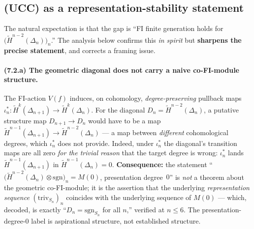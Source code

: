 \documentclass[11pt,reqno]{amsart}
\theoremstyle{plain}
\theoremstyle{definition}
\newcommand{\Hred}{\widetilde H}
\newcommand{\sgn}{\mathrm{sgn}}
\newcommand{\triv}{\mathrm{triv}}
\begin{document}
\subsection{(UCC) as a representation-stability statement}\label{ssec:7.2}
\label{ssec:7.2}
The natural expectation is that the gap is ``FI finite generation holds
for $\bigl(\Hred^{n-2}(\Delta_n)\bigr)_n$.'' The analysis below confirms
this \emph{in spirit} but \textbf{sharpens the precise statement}, and
corrects a framing issue.

\paragraph{(7.2.a) The geometric diagonal does not carry a naive
co-FI-module structure.}
The FI-action $V(f)$ induces, on cohomology, \emph{degree-preserving}
pullback maps
$\iota_n^*:\Hred^k(\Delta_{n+1})\to\Hred^k(\Delta_n)$. For the diagonal
$D_n=\Hred^{n-2}(\Delta_n)$, a putative structure map
$D_{n+1}\to D_n$ would have to be a map
$\Hred^{n-1}(\Delta_{n+1})\to\Hred^{n-2}(\Delta_n)$ --- a map between
\emph{different} cohomological degrees, which $\iota_n^*$ does not
provide. Indeed, under $\iota_n^*$ the diagonal's transition maps are
all zero \emph{for the trivial reason} that the target degree is wrong:
$\iota_n^*$ lands $\Hred^{n-1}(\Delta_{n+1})$ in
$\Hred^{n-1}(\Delta_n)=0$. \textbf{Consequence:} the statement
``$\bigl(\Hred^{n-2}(\Delta_n)\otimes\sgn\bigr)_n=M(0)$, presentation
degree~$0$'' is \emph{not} a theorem about the geometric co-FI-module;
it is the assertion that the underlying \emph{representation sequence}
$(\triv_{S_n})_n$ coincides with the underlying sequence of $M(0)$ ---
which, decoded, is exactly ``$D_n=\sgn_{S_n}$ for all $n$,'' verified at
$n\le6$. The presentation-degree-$0$ label is aspirational structure,
not established structure.
\end{document}
